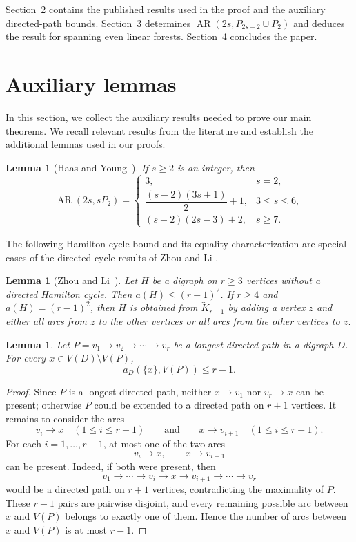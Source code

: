 \documentclass[12pt]{article}
\newtheorem{lemma}[theorem]{Lemma}
\DeclareMathOperator{\AR}{AR}
\newcommand{\sK}{\overleftrightarrow{K}}
\begin{document}
Section~2 contains the published results used in the proof and the
auxiliary directed-path bounds. Section~3 determines $\AR(2s,P_{2s-2}\cup P_2)$
and deduces the result for spanning even linear forests. Section~4
concludes the paper.

\section{Auxiliary lemmas}

In this section, we collect the auxiliary results needed to prove our main theorems. We recall relevant results from the literature and establish the additional lemmas used in our proofs.

\begin{lemma}[Haas and Young~\cite{HY}]
\label{lem:HY} If $s\geq2$ is an integer, then 
\[
\AR(2s,sP_2)=
 \begin{cases}
  3,&s=2,\\[1mm]
  \dfrac{(s-2)(3s+1)}{2}+1,&3\le s\le6,\\[2mm]
  (s-2)(2s-3)+2,&s\ge7.
 \end{cases}
\]
\end{lemma}

The following Hamilton-cycle bound and its equality characterization are
special cases of the directed-cycle results of Zhou and Li \cite{ZL}.

\begin{lemma}[Zhou and Li~\cite{ZL}]\label{lem:cycle-density}
Let $H$ be a digraph on $r\ge3$ vertices without a directed Hamilton cycle.
Then $a(H)\le(r-1)^2$. If $r\ge4$ and $a(H)=(r-1)^2$, then $H$ is obtained
from $\sK_{r-1}$ by adding a vertex $z$ and either all arcs from $z$ to
the other vertices or all arcs from the other vertices to $z$.
\end{lemma}


\begin{lemma}\label{lem:insertion}
Let $P=v_1\to v_2\to\cdots\to v_r$ be a longest directed path in a
digraph $D$. For every $x\in V(D)\setminus V(P)$,
\[
 a_D(\{x\},V(P))\le r-1.
\]
\end{lemma}

\begin{proof}
	Since \(P\) is a longest directed path, neither \(x\to v_1\) nor
	\(v_r\to x\) can be present; otherwise \(P\) could be extended to a
	directed path on \(r+1\) vertices.
	It remains to consider the arcs
	\[
	v_i\to x \quad (1\le i\le r-1)
	\qquad\text{and}\qquad
	x\to v_{i+1} \quad (1\le i\le r-1).
	\]
	For each \(i=1,\ldots,r-1\), at most one of the two arcs
	\[
	v_i\to x,\qquad x\to v_{i+1}
	\]
	can be present. Indeed, if both were present, then
	\[
	v_1\to\cdots\to v_i\to x\to v_{i+1}\to\cdots\to v_r
	\]
	would be a directed path on \(r+1\) vertices, contradicting the maximality
	of \(P\).	
	These \(r-1\) pairs are pairwise disjoint, and every remaining possible
	arc between \(x\) and \(V(P)\) belongs to exactly one of them. Hence the
	number of arcs between \(x\) and \(V(P)\) is at most \(r-1\).
\end{proof}
\end{document}
